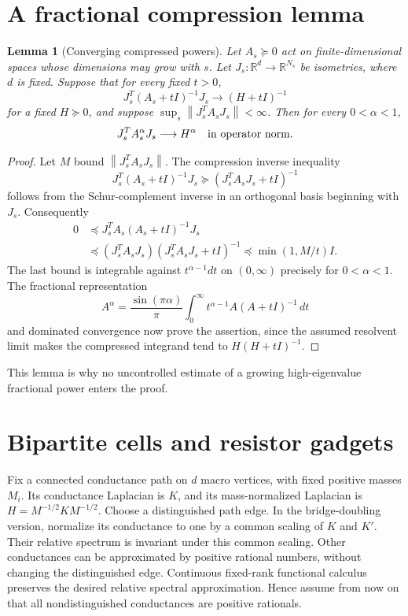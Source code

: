\documentclass[11pt]{article}
\newtheorem{lemma}[theorem]{Lemma}
\newcommand{\R}{\mathbb R}
\newcommand{\norm}[1]{\left\lVert#1\right\rVert}
\begin{document}
\section{A fractional compression lemma}
\begin{lemma}[Converging compressed powers]\label{lem:compression}
Let $A_s\succeq0$ act on finite-dimensional spaces whose dimensions
may grow with $s$. Let $J_s:\R^d\to\R^{N_s}$ be isometries, where
$d$ is fixed. Suppose that for every fixed $t>0$,
\[
 J_s^T(A_s+tI)^{-1}J_s\longrightarrow(H+tI)^{-1}
\]
for a fixed $H\succeq0$, and suppose
$\sup_s\norm{J_s^TA_sJ_s}<\infty$. Then for every $0<\alpha<1$,
\[
 J_s^T A_s^\alpha J_s\longrightarrow H^\alpha
 \quad\hbox{in operator norm}.
\]
\end{lemma}
\begin{proof}
Let $M$ bound $\norm{J_s^TA_sJ_s}$. The compression inverse inequality
\[
 J_s^T(A_s+tI)^{-1}J_s
       \succeq(J_s^TA_sJ_s+tI)^{-1}
\]
follows from the Schur-complement inverse in an orthogonal basis
beginning with $J_s$. Consequently
\begin{align*}
 0&\preceq J_s^T A_s(A_s+tI)^{-1}J_s\\
  &\preceq (J_s^TA_sJ_s)(J_s^TA_sJ_s+tI)^{-1}
   \preceq\min(1,M/t)I.
\end{align*}
The last bound is integrable against $t^{\alpha-1}dt$ on
$(0,\infty)$ precisely for $0<\alpha<1$.
The fractional representation
\[
 A^\alpha=\frac{\sin(\pi\alpha)}\pi
             \int_0^\infty t^{\alpha-1}A(A+tI)^{-1}\,dt
\]
and dominated convergence now prove the assertion, since the assumed
resolvent limit makes the compressed integrand tend to
$H(H+tI)^{-1}$.
\end{proof}

This lemma is why no uncontrolled estimate of a growing high-eigenvalue
fractional power enters the proof.

\section{Bipartite cells and resistor gadgets}
Fix a connected conductance path on $d$ macro vertices, with fixed
positive masses $M_i$. Its conductance Laplacian is $K$, and its
mass-normalized Laplacian is $H=M^{-1/2}KM^{-1/2}$.
Choose a distinguished path edge. In the bridge-doubling version,
normalize its conductance to one by a common scaling of $K$ and $K'$.
Their relative spectrum is invariant under this common scaling.
Other conductances can be approximated by positive rational numbers,
without changing the distinguished edge. Continuous fixed-rank
functional calculus preserves the desired relative spectral approximation.
Hence assume from now on that all nondistinguished conductances are
positive rationals.
\end{document}
